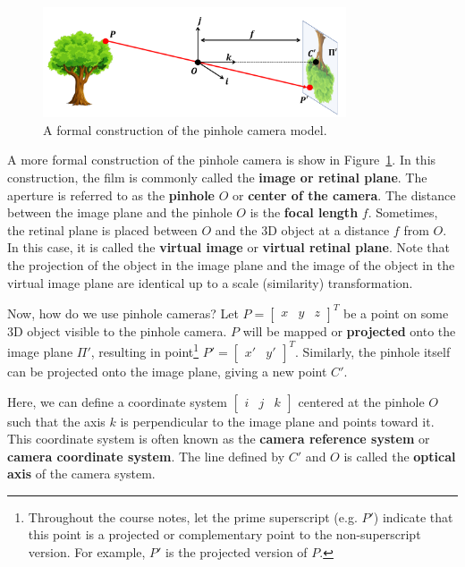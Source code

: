 \documentclass[a4paper, 12pt]{article}
\renewcommand\emph{\textbf}
\begin{document}
\begin{figure}[h!]
\centering
\includegraphics[width=0.8\textwidth]{figures/1-2.pdf}
\caption{A formal construction of the pinhole camera model.}
\label{fig:pinholeCamera}
\end{figure}
A more formal construction of the pinhole camera is show in Figure~\ref{fig:pinholeCamera}. In this construction, the film is commonly called the \emph{image or retinal plane}. The aperture is referred to as the \emph{pinhole} $O$ or \emph{center of the camera}. The distance between the image plane and the pinhole $O$ is the \emph{focal length} $f$. Sometimes, the retinal plane is placed between $O$ and the 3D object at a distance $f$ from $O$. In this case, it is called the \emph{virtual image} or \emph{virtual retinal plane}. Note that the projection of the object in the image plane and the image of the object in the virtual image plane are identical up to a scale (similarity) transformation.

Now, how do we use pinhole cameras? Let $P = \begin{bmatrix}x & y & z\end{bmatrix}^T$ be a point on some 3D object visible to the pinhole camera. $P$ will be mapped or \textbf{projected} onto the image plane $\Pi'$, resulting in point\footnote{Throughout the course notes, let the prime superscript (e.g. $P'$) indicate that this point is a projected or complementary point to the non-superscript version. For example, $P'$ is the projected version of $P$.} $P' = \begin{bmatrix}x' & y'\end{bmatrix}^T$. Similarly, the pinhole itself can be projected onto the image plane, giving a new point $C'$. 

Here, we can define a coordinate system $\begin{bmatrix}i & j & k\end{bmatrix}$ centered at the pinhole $O$ such that the axis $k$ is perpendicular to the image plane and points toward it. This coordinate system is often known as the \emph{camera reference system} or \emph{camera coordinate system}. The line defined by $C'$ and $O$ is called the \emph{optical axis} of the camera system.
\end{document}
